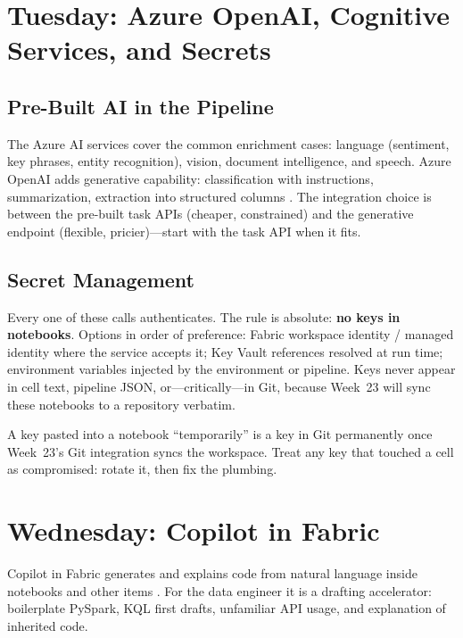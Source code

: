 \section{Tuesday: Azure OpenAI, Cognitive Services, and Secrets}
\subsection{Pre-Built AI in the Pipeline}
The Azure AI services cover the common enrichment cases: language (sentiment, key phrases, entity recognition), vision, document intelligence, and speech. Azure OpenAI adds generative capability: classification with instructions, summarization, extraction into structured columns \cite{microsoftFabricAiServices,synapseML}. The integration choice is between the pre-built task APIs (cheaper, constrained) and the generative endpoint (flexible, pricier)---start with the task API when it fits.

\subsection{Secret Management}
Every one of these calls authenticates. The rule is absolute: \textbf{no keys in notebooks}. Options in order of preference: Fabric workspace identity / managed identity where the service accepts it; Key Vault references resolved at run time; environment variables injected by the environment or pipeline. Keys never appear in cell text, pipeline JSON, or---critically---in Git, because Week~23 will sync these notebooks to a repository verbatim.

\begin{pitfall}
A key pasted into a notebook ``temporarily'' is a key in Git permanently once Week~23's Git integration syncs the workspace. Treat any key that touched a cell as compromised: rotate it, then fix the plumbing.
\end{pitfall}

\section{Wednesday: Copilot in Fabric}
Copilot in Fabric generates and explains code from natural language inside notebooks and other items \cite{microsoftFabricCopilot}. For the data engineer it is a drafting accelerator: boilerplate PySpark, KQL first drafts, unfamiliar API usage, and explanation of inherited code.

